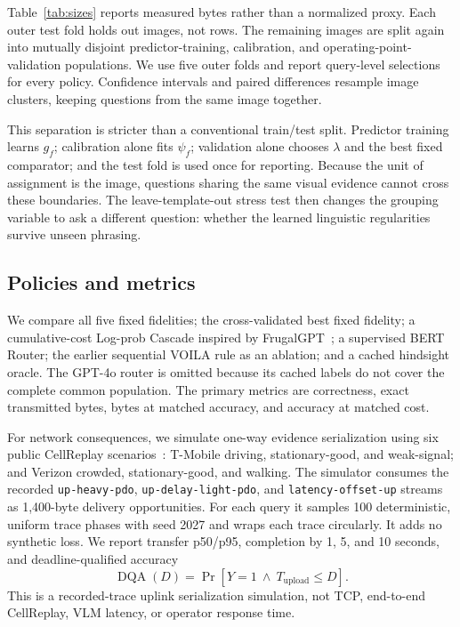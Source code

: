 \documentclass[10pt,conference]{IEEEtran}
\newcommand{\system}{\textsc{VOILA}\xspace}
\newcommand{\dqa}{\operatorname{DQA}}
\newcommand{\tableformat}{\footnotesize\setlength{\tabcolsep}{3.5pt}\renewcommand{\arraystretch}{0.95}}
\begin{document}
\begin{table}[t]
\centering
\tableformat
\caption{Measured cached representation sizes on the common FloodNet
population. The router reads these byte counts as metadata.}
\label{tab:sizes}

\end{table}

Table~\ref{tab:sizes} reports measured bytes rather than a normalized proxy.
Each outer test fold holds out images, not rows. The remaining images are split
again into mutually disjoint predictor-training, calibration, and
operating-point-validation populations. We use five outer folds and report
query-level selections for every policy. Confidence intervals and paired
differences resample image clusters, keeping questions from the same image
together.

This separation is stricter than a conventional train/test split. Predictor
training learns $g_f$; calibration alone fits $\psi_f$; validation alone chooses
$\lambda$ and the best fixed comparator; and the test fold is used once for
reporting. Because the unit of assignment is the image, questions sharing the
same visual evidence cannot cross these boundaries. The leave-template-out
stress test then changes the grouping variable to ask a different question:
whether the learned linguistic regularities survive unseen phrasing.

\subsection{Policies and metrics}

We compare all five fixed fidelities; the cross-validated best fixed fidelity;
a cumulative-cost Log-prob Cascade inspired by FrugalGPT~\cite{
chen2023frugalgpt}; a supervised BERT Router; the earlier sequential \system
rule as an ablation; and a cached hindsight oracle. The GPT-4o router is omitted
because its cached labels do not cover the complete common population. The
primary metrics are correctness, exact transmitted bytes, bytes at matched
accuracy, and accuracy at matched cost.

For network consequences, we simulate one-way evidence serialization using six
public CellReplay scenarios~\cite{cellreplay-nsdi25}: T-Mobile driving,
stationary-good, and weak-signal; and Verizon crowded, stationary-good, and
walking. The simulator consumes the recorded \texttt{up-heavy-pdo},
\texttt{up-delay-light-pdo}, and \texttt{latency-offset-up} streams as
1,400-byte delivery opportunities. For each query it samples 100 deterministic,
uniform trace phases with seed 2027 and wraps each trace circularly. It adds no
synthetic loss. We report transfer p50/p95, completion by 1, 5, and 10 seconds,
and deadline-qualified accuracy
\begin{equation}
 \dqa(D)=\Pr[Y=1\ \wedge\ T_{\mathrm{upload}}\leq D].
\end{equation}
This is a recorded-trace uplink serialization simulation, not TCP, end-to-end
CellReplay, VLM latency, or operator response time.
\end{document}
